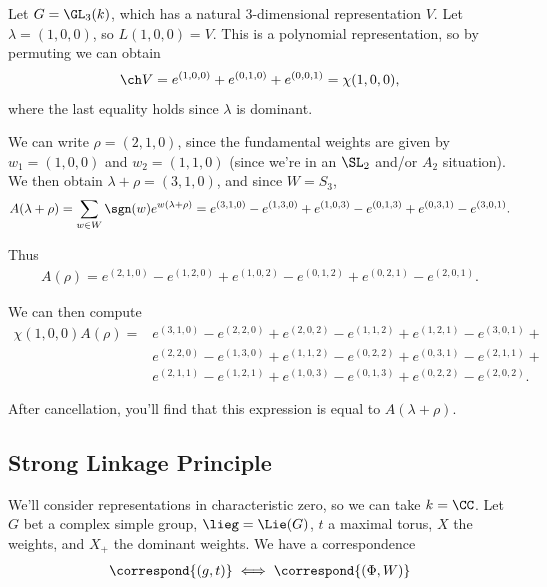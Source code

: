 \begin{example}

Let \(G = \GL_3(k)\), which has a natural 3-dimensional representation
\(V\). Let \(\lambda = (1,0,0)\), so \(L(1,0,0) = V\). This is a
polynomial representation, so by permuting we can obtain
\begin{align*}  
\ch V = e^{(1,0,0)} + e^{(0,1,0)} + e^{(0,0,1)} = \chi(1,0,0)
,\end{align*} where the last equality holds since \(\lambda\) is
dominant.

We can write \(\rho = (2,1,0)\), since the fundamental weights are given
by \(w_1 = (1,0,0)\) and \(w_2 = (1,1,0)\) (since we're in an \(\SL_2\)
and/or \(A_2\) situation). We then obtain \(\lambda + \rho = (3,1,0)\),
and since \(W= S_3\),
\begin{align*}  
A(\lambda + \rho) = \sum_{w\in W} \sgn(w) e^{w(\lambda + \rho)}
=
e^{(3,1,0)} -
e^{(1,3,0)} + 
e^{(1,0,3)} - 
e^{(0,1,3)} + 
e^{(0,3,1)} - 
e^{(3,0,1)}
.\end{align*}

Thus
\begin{align*}  
A(\rho) =
e^{(2,1,0)} -
e^{(1,2,0)} + 
e^{(1,0,2)} - 
e^{(0,1,2)} + 
e^{(0,2,1)} - 
e^{(2,0,1)}
.\end{align*}

We can then compute
\begin{align*}  
\chi(1,0,0) A(\rho) = &e^{(3,1,0)}
- e^{(2,2,0)} + 
e^{(2,0,2)} 
-e^{(1,1,2)} + 
e^{(1,2,1)}
- e^{(3,0,1)} + 
\\
&e^{(2,2,0)} -
e^{(1,3,0)} + 
e^{(1,1,2)} - 
e^{(0,2,2)} + 
e^{(0,3,1)} - 
e^{(2,1,1)} + 
\\
&e^{(2,1,1)} -
e^{(1,2,1)} + 
e^{(1,0,3)} - 
e^{(0,1,3)} + 
e^{(0,2,2)} - 
e^{(2,0,2)}
.\end{align*}

After cancellation, you'll find that this expression is equal to
\(A(\lambda + \rho)\).

\end{example}

\hypertarget{strong-linkage-principle}{%
\subsection{Strong Linkage Principle}\label{strong-linkage-principle}}

We'll consider representations in characteristic zero, so we can take
\(k=\CC\). Let \(G\) bet a complex simple group, \(\lieg = \Lie(G)\),
\(t\) a maximal torus, \(X\) the weights, and \(X_+\) the dominant
weights. We have a correspondence \Large
\begin{align*}  
\correspond{(g, t)} \iff
\correspond{(\Phi, W)}
\end{align*} \normalsize

